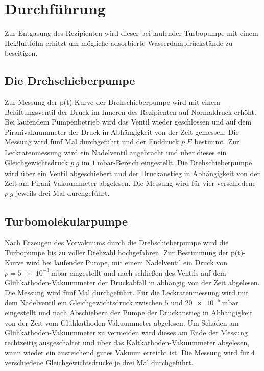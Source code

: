 \section{Durchführung}
\label{sec:Durchführung}

Zur Entgasung des Rezipienten wird dieser bei laufender Turbopumpe mit einem Heißluftföhn erhitzt um mögliche adsorbierte Wasserdampfrückstände zu beseitigen.

\subsection{Die Drehschieberpumpe}

Zur Messung der p(t)-Kurve der Drehschieberpumpe wird mit einem Belüftungsventil der Druck im Inneren des Rezipienten auf Normaldruck erhöht. Bei laufendem Pumpenbetrieb wird das Ventil wieder geschlossen und auf dem Piranivakuummeter der Druck in Abhängigkeit von der Zeit gemessen.
Die Messung wird fünf Mal durchgeführt und der Enddruck $p_.E$ bestimmt.\newline
Zur Leckratenmessung wird ein Nadelventil angebracht und über dieses ein Gleichgewichtsdruck $p_.g$ im $\SI{1}{\milli\bar}$-Bereich eingestellt. Die Drehschieberpumpe wird über ein Ventil abgeschiebert und der Druckanstieg in Abhängigkeit von der Zeit am Pirani-Vakuummeter abgelesen.
Die Messung wird für vier verschiedene $p_.g$ jeweils drei Mal durchgeführt.

\subsection{Turbomolekularpumpe}

Nach Erzeugen des Vorvakuums durch die Drehschieberpumpe wird die Turbopumpe bis zu voller Drehzahl hochgefahren.
Zur Bestimmung der p(t)-Kurve wird bei laufender Pumpe, mit einem Nadelventil ein Druck von $p=\SI{5e-3}{\milli\bar}$ eingestellt und nach schließen des Ventils auf dem Glühkathoden-Vakuummeter der Druckabfall in abhängig von der Zeit abgelesen. Die Messung wird fünf Mal durchgeführt.\newline
Für die Leckratenmessung wird mit dem Nadelventil ein Gleichgewichtsdruck zwischen $5$ und $\SI{20e-5}{\milli\bar}$ eingestellt und nach Abschiebern der Pumpe der Druckanstieg in Abhängigkeit von der Zeit vom Glühkathoden-Vakuummeter abgelesen. Um Schäden am Glühkathoden-Vakuummeter zu vermeiden wird dieses am Ende der Messung rechtzeitig ausgeschaltet und über das Kaltkathoden-Vakuummeter abgelesen, wann wieder ein ausreichend gutes Vakuum erreicht ist. Die Messung wird für 4 verschiedene Gleichgewichtsdrücke je drei Mal durchgeführt.


